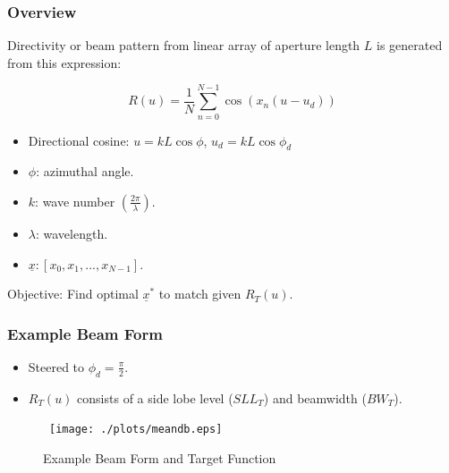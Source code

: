 \documentclass[...]{beamer}
\begin{document}
\begin{frame}
  \frametitle{Overview}

  Directivity or beam pattern from linear array of aperture length $L$ is generated from this expression:

  \begin{equation*}
    R(u) = \frac{1}{N}\sum\limits_{n=0}^{N-1}\cos\left(x_n(u - u_d)\right)
  \end{equation*}

  \begin{itemize}
    \item Directional cosine: $u=kL\cos\phi$, $u_d=kL\cos\phi_d$
    \item $\phi$: azimuthal angle.
    \item $k$: wave number $\left(\frac{2\pi}{\lambda}\right)$.
    \item $\lambda$: wavelength.
    \item $\underline{x}: [x_0, x_1, ..., x_{N-1}]$.
  \end{itemize}

  \vspace{3mm}
  Objective: Find optimal $\underline{x}^*$ to match given $R_T(u)$.

\end{frame}

\begin{frame}
  \frametitle{Example Beam Form}

  \begin{itemize}
    \item Steered to $\phi_d=\frac{\pi}{2}$.
    \item $R_T(u)$ consists of a side lobe level ($SLL_T$) and beamwidth ($BW_T$).
  \end{itemize}

  \begin{figure} 
    \centerline{\hbox{ \hspace{0.0in}
        \texttt{[image: ./plots/meandb.eps]}
      }
    }
    \caption {Example Beam Form and Target Function}\label{fig:meandb}
  \end{figure}

\end{frame}
\end{document}
